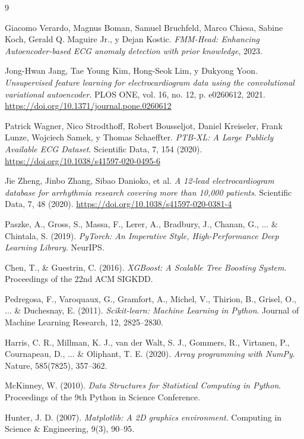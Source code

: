 \documentclass[11pt]{article}
\begin{document}
\begin{thebibliography}{9}



Giacomo Verardo, Magnus Boman, Samuel Bruchfeld, Marco Chiesa, Sabine Koch, Gerald Q. Maguire Jr., y Dejan Kostic.  
\textit{FMM-Head: Enhancing Autoencoder-based ECG anomaly detection with prior knowledge}, 2023.

Jong-Hwan Jang, Tae Young Kim, Hong-Seok Lim, y Dukyong Yoon.  
\textit{Unsupervised feature learning for electrocardiogram data using the convolutional variational autoencoder}.  
PLOS ONE, vol. 16, no. 12, p. e0260612, 2021.  
\url{https://doi.org/10.1371/journal.pone.0260612}

Patrick Wagner, Nico Strodthoff, Robert Bousseljot, Daniel Kreiseler, Frank Lunze, Wojciech Samek, y Thomas Schaeffter.  
\textit{PTB-XL: A Large Publicly Available ECG Dataset}. Scientific Data, 7, 154 (2020).  
\url{https://doi.org/10.1038/s41597-020-0495-6}

Jie Zheng, Jinbo Zhang, Sibao Danioko, et al.  
\textit{A 12-lead electrocardiogram database for arrhythmia research covering more than 10,000 patients}. Scientific Data, 7, 48 (2020).  
\url{https://doi.org/10.1038/s41597-020-0381-4}

Paszke, A., Gross, S., Massa, F., Lerer, A., Bradbury, J., Chanan, G., ... \& Chintala, S. (2019).  
\textit{PyTorch: An Imperative Style, High-Performance Deep Learning Library}. NeurIPS.

Chen, T., \& Guestrin, C. (2016).  
\textit{XGBoost: A Scalable Tree Boosting System}. Proceedings of the 22nd ACM SIGKDD.

Pedregosa, F., Varoquaux, G., Gramfort, A., Michel, V., Thirion, B., Grisel, O., ... \& Duchesnay, E. (2011).  
\textit{Scikit-learn: Machine Learning in Python}. Journal of Machine Learning Research, 12, 2825–2830.

Harris, C. R., Millman, K. J., van der Walt, S. J., Gommers, R., Virtanen, P., Cournapeau, D., ... \& Oliphant, T. E. (2020).  
\textit{Array programming with NumPy}. Nature, 585(7825), 357–362.

McKinney, W. (2010).  
\textit{Data Structures for Statistical Computing in Python}. Proceedings of the 9th Python in Science Conference.

Hunter, J. D. (2007).  
\textit{Matplotlib: A 2D graphics environment}. Computing in Science \& Engineering, 9(3), 90–95.

\end{thebibliography}
\end{document}
